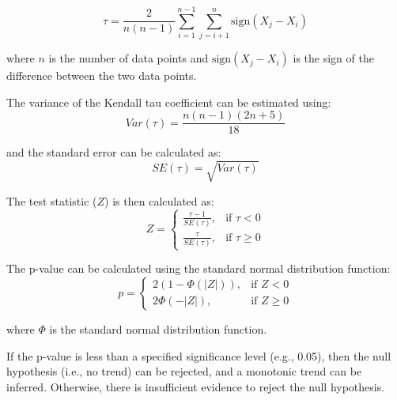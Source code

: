 \documentclass[a4paper, 12pt, twoside]{report}
\begin{document}
\begin{enumerate}
\begin{itemize}
                    \begin{equation}
                        \tau = \frac{2}{n(n-1)}\sum_{i=1}^{n-1}\sum_{j=i+1}^{n} \text{sign}(X_j-X_i)
                    \end{equation}

                    where $n$ is the number of data points and $\text{sign}(X_j-X_i)$ is the sign of the difference between the two data points.

                    The variance of the Kendall tau coefficient can be estimated using:
                    \begin{equation}
                        Var(\tau) = \frac{n(n-1)(2n+5)}{18}
                    \end{equation}


                    and the standard error can be calculated as:
                    \begin{equation}
                        SE(\tau) = \sqrt{Var(\tau)}
                    \end{equation}

                    The test statistic ($Z$) is then calculated as:
                    \begin{equation}
                        Z = \begin{cases}
                            \frac{\tau - 1}{SE(\tau)}, & \text{if } \tau < 0    \\
                            \frac{\tau}{SE(\tau)},     & \text{if } \tau \geq 0
                        \end{cases}
                    \end{equation}


                    The p-value can be calculated using the standard normal distribution function:
                    \begin{equation}
                        p = \begin{cases}
                            2(1-\Phi(|Z|)), & \text{if } Z < 0    \\
                            2\Phi(-|Z|),    & \text{if } Z \geq 0
                        \end{cases}
                    \end{equation}


                    where $\Phi$ is the standard normal distribution function.

                    If the p-value is less than a specified significance level (e.g., 0.05), then the null hypothesis (i.e., no trend) can be rejected, and a monotonic trend can be inferred. Otherwise, there is insufficient evidence to reject the null hypothesis.
          \end{itemize}

\end{enumerate}
\end{document}
